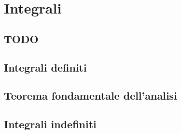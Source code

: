 
\chapter{Integrali}

\section{TODO}

\section{Integrali definiti}
\label{sec:01_integralidefiniti}

% 

\section{Teorema fondamentale dell'analisi}
\label{sec:02_teorema}


\section{Integrali indefiniti}
\label{sec:03_integraliindefiniti}

